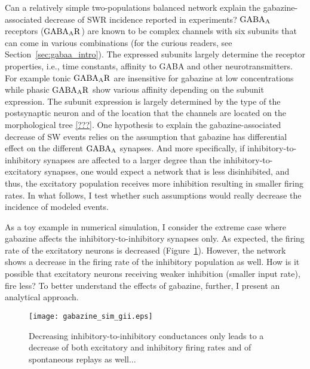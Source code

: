    Can a relatively simple two-populations balanced network explain the
    gabazine-associated decrease of SWR incidence reported in experiments?
    $\rm GABA_A$ receptors ($\rm GABA_A R$) are known to be complex channels
    with six subunits that can come in various combinations (for the curious
    readers, see Section~\ref{sec:gabaa_intro}). The expressed subunits largely
    determine the receptor properties, i.e., time constants, affinity to GABA
    and other neurotransmitters. For example tonic $\rm GABA_A R$ are
    insensitive for gabazine at low concentrations while phasic $\rm GABA_A R$
    show various affinity depending on the subunit expression. The subunit
    expression is largely determined by the type of the postsynaptic neuron and
    of the location that the channels are located on the morphological tree
    \ref{???}. One hypothesis to explain the gabazine-associated decrease of SW
    events relies on the assumption that gabazine has differential effect on
    the different $\rm GABA_A$ synapses. And more specifically, if
    inhibitory-to-inhibitory synapses are affected to a larger degree than the
    inhibitory-to-excitatory synapses, one would expect a network that is less
    disinhibited, and thus, the excitatory population receives more inhibition
    resulting in smaller firing rates. In what follows, I test whether such
    assumptions would really decrease the incidence of modeled events.

    As a toy example in numerical simulation, I consider the extreme case where
    gabazine affects the inhibitory-to-inhibitory synapses only. As expected,
    the firing rate of the excitatory neurons is decreased
    (Figure~\ref{fig:gabazine_sim_giionly}). However, the network shows a
    decrease in the firing rate of the inhibitory population as well. How is it
    possible that excitatory neurons receiving weaker inhibition (smaller input
    rate), fire less? To better understand the effects of gabazine, further, I
    present an analytical approach.
    
    \begin{figure}
      \texttt{[image: gabazine\_sim\_gii.eps]}
      \caption{Decreasing inhibitory-to-inhibitory conductances only leads to a decrease of both excitatory and
                inhibitory firing rates and of spontaneous replays as well...
      }
    \label{fig:gabazine_sim_giionly}
    \end{figure}

